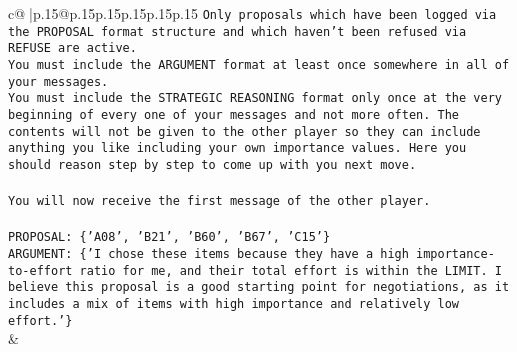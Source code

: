 \documentclass{article}
\begin{document}
{\begin{supertabular}{c@{$\;$}|p{.15\linewidth}@{}p{.15\linewidth}p{.15\linewidth}p{.15\linewidth}p{.15\linewidth}p{.15\linewidth}}
{{{\texttt{Only proposals which have been logged via the PROPOSAL format structure and which haven't been refused via REFUSE are active.} \\
\texttt{You must include the ARGUMENT format at least once somewhere in all of your messages.} \\
\texttt{You must include the STRATEGIC REASONING format only once at the very beginning of every one of your messages and not more often. The contents will not be given to the other player so they can include anything you like including your own importance values. Here you should reason step by step to come up with you next move.} \\
\\ 
\texttt{You will now receive the first message of the other player.} \\
\\ 
\texttt{PROPOSAL: \{'A08', 'B21', 'B60', 'B67', 'C15'\} } \\
\texttt{ARGUMENT: \{'I chose these items because they have a high importance{-}to{-}effort ratio for me, and their total effort is within the LIMIT. I believe this proposal is a good starting point for negotiations, as it includes a mix of items with high importance and relatively low effort.'\}} \\
            }
        }
    }
    & \\ \\


\end{supertabular}}
\end{document}
